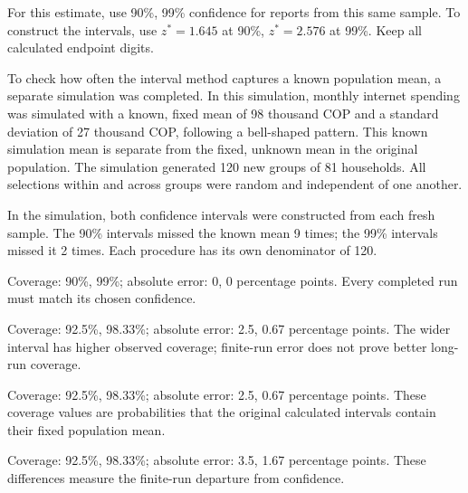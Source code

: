 For this estimate, use 90\%, 99\% confidence for reports from this same sample. To construct the intervals, use $z^*=1.645$ at 90\%, $z^*=2.576$ at 99\%. Keep all calculated endpoint digits.

To check how often the interval method captures a known population mean, a separate simulation was completed. In this simulation, monthly internet spending was simulated with a known, fixed mean of 98 thousand COP and a standard deviation of 27 thousand COP, following a bell-shaped pattern. This known simulation mean is separate from the fixed, unknown mean in the original population. The simulation generated 120 new groups of 81 households. All selections within and across groups were random and independent of one another.

In the simulation, both confidence intervals were constructed from each fresh sample.
The 90\% intervals missed the known mean 9 times; the 99\% intervals missed it 2 times. Each procedure has its own denominator of 120.

\begin{answeroptions}
\item Coverage: 90\%, 99\%; absolute error: 0, 0 percentage points. Every completed run must match its chosen confidence.
\item Coverage: 92.5\%, 98.33\%; absolute error: 2.5, 0.67 percentage points. The wider interval has higher observed coverage; finite-run error does not prove better long-run coverage.
\item Coverage: 92.5\%, 98.33\%; absolute error: 2.5, 0.67 percentage points. These coverage values are probabilities that the original calculated intervals contain their fixed population mean.
\item Coverage: 92.5\%, 98.33\%; absolute error: 3.5, 1.67 percentage points. These differences measure the finite-run departure from confidence.
\end{answeroptions}
\clearpage
